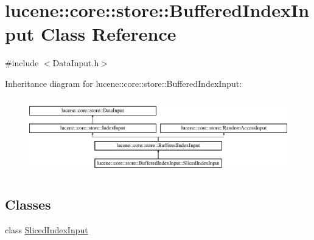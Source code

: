 \hypertarget{classlucene_1_1core_1_1store_1_1BufferedIndexInput}{}\section{lucene\+:\+:core\+:\+:store\+:\+:Buffered\+Index\+Input Class Reference}
\label{classlucene_1_1core_1_1store_1_1BufferedIndexInput}


{\ttfamily \#include $<$Data\+Input.\+h$>$}

Inheritance diagram for lucene\+:\+:core\+:\+:store\+:\+:Buffered\+Index\+Input\+:\begin{figure}[H]
\begin{center}
\leavevmode
\includegraphics[height=3.353293cm]{classlucene_1_1core_1_1store_1_1BufferedIndexInput}
\end{center}
\end{figure}
\subsection*{Classes}
\begin{DoxyCompactItemize}
\item 
class \mbox{\hyperlink{classlucene_1_1core_1_1store_1_1BufferedIndexInput_1_1SlicedIndexInput}{Sliced\+Index\+Input}}
\end{DoxyCompactItemize}
